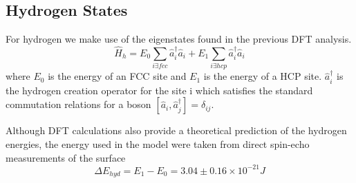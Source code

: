 \subsection{Hydrogen States}
For hydrogen
we make use of the
eigenstates found in
the previous DFT
analysis\cite{Jianding-Zhu}.
\begin{equation}
    \hat{H}_{h} =
    E_0 \sum_{i \exists fcc} \hat{a}^\dagger_i \hat{a}_i
    + E_1 \sum_{i \exists hcp} \hat{a}^\dagger_i \hat{a}_i
\end{equation}
where \(E_0\) is the energy of an FCC site and
\(E_1\) is the energy of a HCP site.
\(\hat{a}^\dagger_i\) is
the hydrogen creation
operator for the site i
which satisfies the standard commutation
relations for a boson
\(\left[ \hat{a}_i, \hat{a}^\dagger_j \right]
= \delta_{ij}\).

Although DFT calculations
also provide a theoretical prediction
of the hydrogen energies, the
energy used in the
model were
taken from direct spin-echo measurements of the
surface\cite{Jianding-Zhu}
\begin{equation}
    \Delta{}E_{hyd} = E_1 - E_0
    = 3.04\pm0.16\times{}10^{-21} J
    \label{eqn:hydrogen energy difference}
\end{equation}


